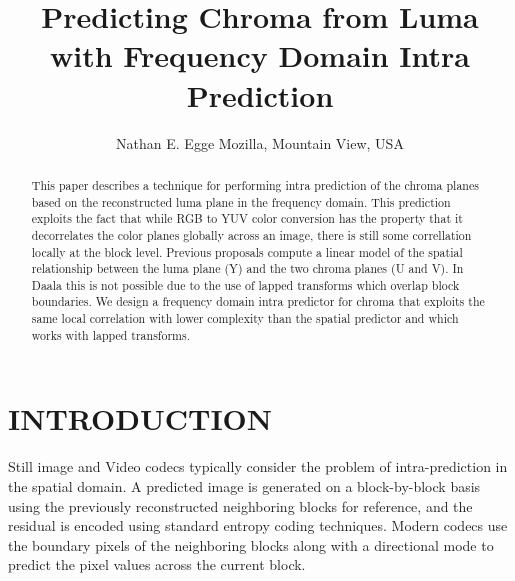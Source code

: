 \documentclass[a4paper]{spie}  %
\title{Predicting Chroma from Luma with Frequency Domain Intra Prediction}
\author{Nathan E. Egge
\skiplinehalf
Mozilla, Mountain View, USA
}
\begin{document}
 
  \maketitle 

\begin{abstract}
This paper describes a technique for performing intra prediction of the chroma
 planes based on the reconstructed luma plane in the frequency domain.
This prediction exploits the fact that while RGB to YUV color conversion has
 the property that it decorrelates the color planes globally across an image,
 there is still some correllation locally at the block level\cite{LeeCho09}.
Previous proposals compute a linear model of the spatial relationship between
 the luma plane (Y) and the two chroma planes (U and V)\cite{JCTVCB021}.
In Daala this is not possible due to the use of lapped transforms which overlap
 block boundaries\cite{Tran2003}.
We design a frequency domain intra predictor for chroma that exploits the same
 local correlation with lower complexity than the spatial predictor and which
 works with lapped transforms.


\end{abstract}



\section{INTRODUCTION}
\label{sec:intro}  %

Still image and Video codecs typically consider the problem of intra-prediction
 in the spatial domain.
A predicted image is generated on a block-by-block basis using the previously
 reconstructed neighboring blocks for reference, and the residual is encoded
 using standard entropy coding techniques.
Modern codecs use the boundary pixels of the neighboring blocks along with a
 directional mode to predict the pixel values across the current block.
\end{document}
